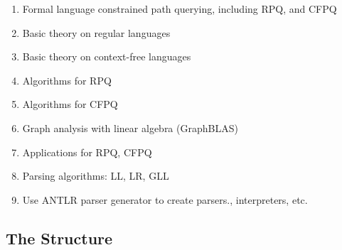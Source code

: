 \documentclass[sigconf]{acmart}
\begin{document}
\begin{enumerate}
  \item Formal language constrained path querying, including RPQ, and CFPQ
  \item Basic theory on regular languages
  \item Basic theory on context-free languages
  \item Algorithms for RPQ
  \item Algorithms for CFPQ
  \item Graph analysis with linear algebra (GraphBLAS)
  \item Applications for RPQ, CFPQ
  \item Parsing algorithms: LL, LR, GLL
  \item Use ANTLR parser generator to create parsers., interpreters, etc.
\end{enumerate}

\subsection{The Structure}
\end{document}
